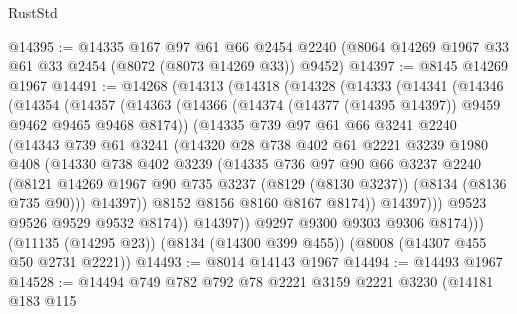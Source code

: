 \begin{lexlean}{RustStd}
\begin{coremodule}
@14395 := @14335
    @167
    @97
    @61
    @66
    @2454
    @2240
    (@8064 @14269 @1967 @33 @61 @33 @2454 (@8072 (@8073 @14269 @33)) @9452)
@14397 := @8145 @14269 @1967
@14491 := @14268
    (@14313
      (@14318
        (@14328
          (@14333
            (@14341
              (@14346
                (@14354
                  (@14357
                    (@14363
                      (@14366 (@14374 (@14377 (@14395 @14397)) @9459 @9462 @9465 @9468 @8174))
                      (@14335
                        @739
                        @97
                        @61
                        @66
                        @3241
                        @2240
                        (@14343
                          @739
                          @61
                          @3241
                          (@14320
                            @28
                            @738
                            @402
                            @61
                            @2221
                            @3239
                            @1980
                            @408
                            (@14330
                              @738
                              @402
                              @3239
                              (@14335
                                @736
                                @97
                                @90
                                @66
                                @3237
                                @2240
                                (@8121
                                  @14269
                                  @1967
                                  @90
                                  @735
                                  @3237
                                  (@8129 (@8130 @3237))
                                  (@8134 (@8136 @735 @90)))
                                @14397))
                            @8152
                            @8156
                            @8160
                            @8167
                            @8174))
                        @14397)))
                  @9523
                  @9526
                  @9529
                  @9532
                  @8174))
              @14397))
          @9297
          @9300
          @9303
          @9306
          @8174)))
    (@11135 (@14295 @23))
    (@8134 (@14300 @399 @455))
    (@8008 (@14307 @455 @50 @2731 @2221))
@14493 := @8014 @14143 @1967
@14494 := @14493 @1967
@14528 := @14494
    @749
    @782
    @792
    @78
    @2221
    @3159
    @2221
    @3230
    (@14181
      @183
      @115

\end{coremodule}
\end{lexlean}
